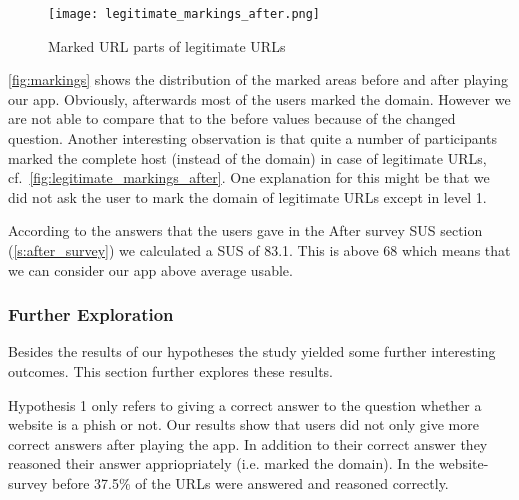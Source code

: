 \begin{description}[leftmargin=0cm]
\begin{figure}
\centering
\texttt{[image: legitimate\_markings\_after.png]}
\caption{Marked URL parts of legitimate URLs}
\label{fig:legitimate_markings_after}
\end{figure}
\autoref{fig:markings} shows the distribution of the marked areas before and after playing our app. Obviously, afterwards most of the users marked the domain. However we are not able to compare that to the before values because of the changed question.
Another interesting observation is that quite a number of participants marked the complete host (instead of the domain) in case of legitimate URLs, cf.~\autoref{fig:legitimate_markings_after}. One explanation for this might be that we did not ask the user to mark the domain of legitimate URLs except in level 1.
\item[Hypothesis 4]
According to the answers that the users gave in the After survey SUS section (\autoref{s:after_survey}) we calculated a SUS of 83.1. This is above 68 which means that we can consider our app above average usable.
\end{description}

\subsubsection{Further Exploration}
\label{s:further_exploration}
Besides the results of our hypotheses the study yielded some further interesting outcomes.
This section further explores these results.


\begin{description}[leftmargin=0cm]
	\item[Correct and Reasoned Answers] Hypothesis 1 only refers to giving a correct answer to the question whether a website is a phish or not.
	Our results show that users did not only give more correct answers after playing the app.
	In addition to their correct answer they reasoned their answer appriopriately (i.e. marked the domain).
	In the website-survey before 37.5\% of the URLs were answered and reasoned correctly.
	

\end{description}




